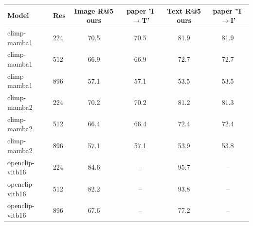 \begin{tabular}{llcccc}
\toprule
Model & Res & Image R@5 ours & paper 'I$\to$T' & Text R@5 ours & paper 'T$\to$I' \\
\midrule
climp-mamba1 & 224 & 70.5 & 70.5 & 81.9 & 81.9 \\
climp-mamba1 & 512 & 66.9 & 66.9 & 72.7 & 72.7 \\
climp-mamba1 & 896 & 57.1 & 57.1 & 53.5 & 53.5 \\
climp-mamba2 & 224 & 70.2 & 70.2 & 81.2 & 81.3 \\
climp-mamba2 & 512 & 66.4 & 66.4 & 72.4 & 72.4 \\
climp-mamba2 & 896 & 57.1 & 57.1 & 53.9 & 53.8 \\
openclip-vitb16 & 224 & 84.6 & – & 95.7 & – \\
openclip-vitb16 & 512 & 82.2 & – & 93.8 & – \\
openclip-vitb16 & 896 & 67.6 & – & 77.2 & – \\
\bottomrule
\end{tabular}
